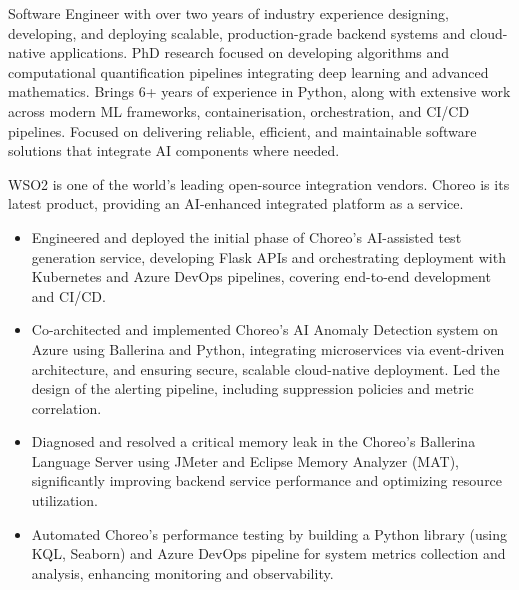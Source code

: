\documentclass[12pt,a4paper,withhyper]{altacv}
\begin{document}


\makecvheader{}

\medskip


Software Engineer with over two years of industry experience designing, developing, and deploying scalable, production-grade backend systems and cloud-native applications. PhD research focused on developing algorithms and computational quantification pipelines integrating deep learning and advanced mathematics. Brings 6+ years of experience in Python, along with extensive work across modern ML frameworks, containerisation, orchestration, and CI/CD pipelines. Focused on delivering reliable, efficient, and maintainable software solutions that integrate AI components where needed.

\medskip


WSO2 is one of the world's leading open-source integration vendors. Choreo is its latest product, providing an AI-enhanced integrated platform as a service.
\medskip

\begin{itemize}
\item Engineered and deployed the initial phase of Choreo's AI-assisted test generation service, developing Flask APIs and orchestrating deployment with Kubernetes and Azure DevOps pipelines, covering end-to-end development and CI/CD.
\item Co-architected and implemented Choreo’s AI Anomaly Detection system on Azure using Ballerina and Python, integrating microservices via event-driven architecture, and ensuring secure, scalable cloud-native deployment. Led the design of the alerting pipeline, including suppression policies and metric correlation.
\item Diagnosed and resolved a critical memory leak in the Choreo's Ballerina Language Server using JMeter and Eclipse Memory Analyzer (MAT), significantly improving backend service performance and optimizing resource utilization.
\item Automated Choreo’s performance testing by building a Python library (using KQL, Seaborn) and Azure DevOps pipeline for system metrics collection and analysis, enhancing monitoring and observability.
\end{itemize}
\end{document}
